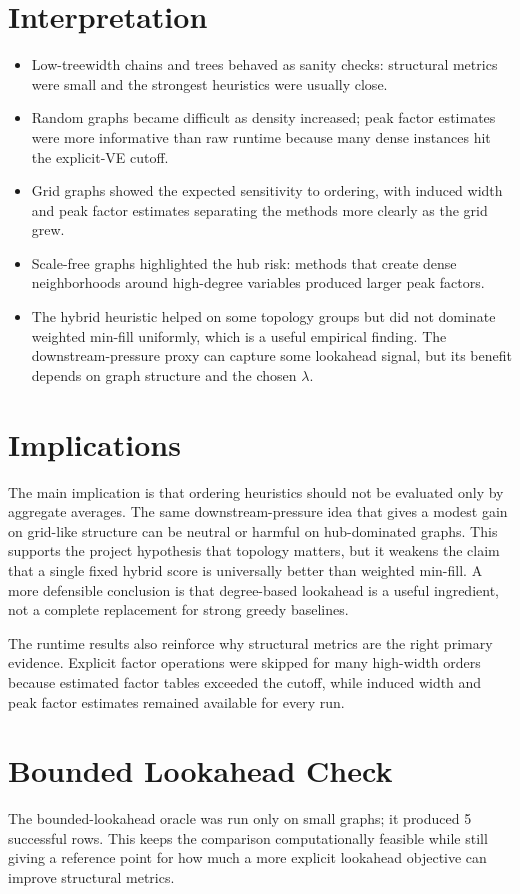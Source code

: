 \documentclass[10pt]{article}
\begin{document}
\section*{Interpretation}
\begin{itemize}
\item Low-treewidth chains and trees behaved as sanity checks: structural metrics were small and the strongest heuristics were usually close.
\item Random graphs became difficult as density increased; peak factor estimates were more informative than raw runtime because many dense instances hit the explicit-VE cutoff.
\item Grid graphs showed the expected sensitivity to ordering, with induced width and peak factor estimates separating the methods more clearly as the grid grew.
\item Scale-free graphs highlighted the hub risk: methods that create dense neighborhoods around high-degree variables produced larger peak factors.
\item The hybrid heuristic helped on some topology groups but did not dominate weighted min-fill uniformly, which is a useful empirical finding. The downstream-pressure proxy can capture some lookahead signal, but its benefit depends on graph structure and the chosen $\lambda$.
\end{itemize}

\section*{Implications}
The main implication is that ordering heuristics should not be evaluated only by aggregate averages. The same downstream-pressure idea that gives a modest gain on grid-like structure can be neutral or harmful on hub-dominated graphs. This supports the project hypothesis that topology matters, but it weakens the claim that a single fixed hybrid score is universally better than weighted min-fill. A more defensible conclusion is that degree-based lookahead is a useful ingredient, not a complete replacement for strong greedy baselines.

The runtime results also reinforce why structural metrics are the right primary evidence. Explicit factor operations were skipped for many high-width orders because estimated factor tables exceeded the cutoff, while induced width and peak factor estimates remained available for every run.

\section*{Bounded Lookahead Check}
The bounded-lookahead oracle was run only on small graphs; it produced 5 successful rows. This keeps the comparison computationally feasible while still giving a reference point for how much a more explicit lookahead objective can improve structural metrics.
\end{document}
